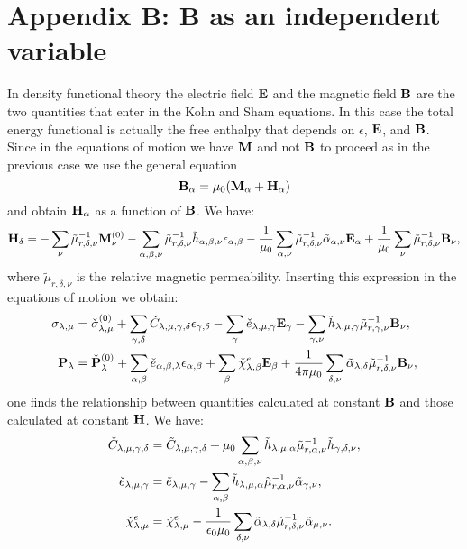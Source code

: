 \documentclass[12pt,a4paper]{article}
\begin{document}
\section{\color{coral}Appendix B: {\bf B} as an independent variable}
In density functional theory the electric field ${\bf E}$ and the
magnetic field ${\bf B}$ are the two quantities that enter in the Kohn
and Sham equations. In this case the total energy functional is 
actually the free enthalpy that depends on $\epsilon$, ${\bf E}$, and 
${\bf B}$. 
Since in the equations of motion we have ${\bf M}$ and not ${\bf B}$ 
to proceed as in the previous case we use the general equation
\begin{equation}
{\bf B}_\alpha= \mu_0({\bf M}_\alpha+{\bf H}_\alpha)
\end{equation}
and obtain ${\bf H}_\alpha$ as a function of ${\bf B}$.
We have:
\begin{equation}
{\bf H}_\delta = - \sum_\nu \tilde \mu^{-1}_{r,\delta,\nu} {\bf M}^{(0)}_\nu
- \sum_{\alpha,\beta,\nu} \tilde \mu^{-1}_{r,\delta,\nu} \tilde h_{\alpha,\beta,\nu}
\epsilon_{\alpha,\beta} - {1\over \mu_0} \sum_{\alpha,\nu}
\tilde \mu^{-1}_{r,\delta,\nu} \tilde \alpha_{\alpha,\nu} {\bf E}_\alpha
+ {1\over \mu_0} \sum_\nu \tilde \mu^{-1}_{r,\delta,\nu} {\bf B}_\nu, 
\end{equation}
where $\tilde \mu_{r,\delta,\nu}$ is the relative magnetic
permeability.
Inserting this expression in the equations of motion we obtain:
\begin{align}
\sigma_{\lambda,\mu}&=  \check \sigma_{\lambda,\mu}^{(0)}
+\sum_{\gamma,\delta} \check C_{\lambda,\mu,\gamma,\delta}  
\epsilon_{\gamma,\delta} -
\sum_{\gamma} \check e_{\lambda,\mu,\gamma} 
 {\bf E}_{\gamma}
-\sum_{\gamma,\nu}  \tilde h_{\lambda,\mu,\gamma} 
\tilde \mu^{-1}_{r,\gamma,\nu} {\bf B}_{\nu}, \\
{\bf P}_{\lambda}&= \check {\bf P}^{(0)}_{\lambda}
+\sum_{\alpha,\beta} \check e_{\alpha,\beta,\lambda} 
\epsilon_{\alpha,\beta} +
\sum_{\beta} 
\check \chi^e_{\lambda,\beta}
{\bf E}_{\beta} +
{1\over 4 \pi \mu_0}\sum_{\delta,\nu} \tilde \alpha_{\lambda,\delta} 
\tilde \mu^{-1}_{r,\delta,\nu}  
{\bf B}_{\nu}, 
\end{align}
one finds the relationship between quantities calculated at constant 
${\bf B}$ and those calculated at constant ${\bf H}$. We have:
\begin{align}
\check C_{\lambda,\mu,\gamma,\delta} &=
\tilde C_{\lambda,\mu,\gamma,\delta} + \mu_0 \sum_{\alpha,\beta,\nu}
\tilde h_{\lambda,\mu,\alpha} \tilde \mu^{-1}_{r,\alpha,\nu} 
\tilde h_{\gamma,\delta,\nu}, \\
\check e_{\lambda,\mu,\gamma}&= \tilde e_{\lambda,\mu,\gamma}
-\sum_{\alpha,\beta} \tilde h_{\lambda,\mu,\alpha} 
\tilde \mu^{-1}_{r,\alpha,\nu}
\tilde \alpha_{\gamma,\nu}, \\
\check \chi^e_{\lambda,\mu}&= \tilde \chi^e_{\lambda,\mu}
-{1\over \epsilon_0 \mu_0} \sum_{\delta,\nu} \tilde \alpha_{\lambda,\delta} 
\tilde \mu^{-1}_{r,\delta,\nu} \tilde \alpha_{\mu,\nu}. 
\end{align}
\end{document}

